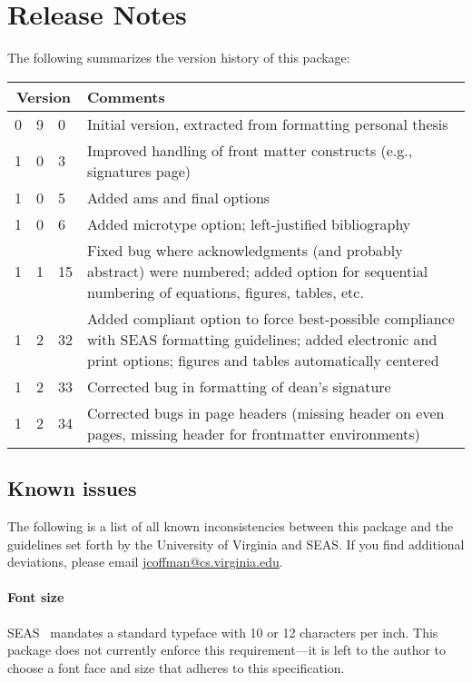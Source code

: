 \documentclass[10pt]{article}
\newcommand{\option}[1]{#1}
\begin{document}


\section{Release Notes}\label{section:release notes}
The following summarizes the version history of this package:
\begin{longtable}{r@{.}r@{.}lp{.8\linewidth}}
  \multicolumn{3}{c}{Version} & Comments\\
  \midrule
  0	& 9	& 0	& Initial version, extracted from formatting personal thesis\\[2ex] %
  1	& 0	& 3	& Improved handling of front matter constructs (e.g., signatures page)\\
  1	& 0	& 5	& Added \option{ams} and \option{final} options\\
  1	& 0	& 6	& Added \option{microtype} option; left-justified bibliography\\
  1	& 1	& 15	& Fixed bug where acknowledgments (and probably abstract) were numbered; added option for sequential numbering of equations, figures, tables, etc.\\
  1	& 2	& 32 	& Added \option{compliant} option to force best-possible compliance with \gls{SEAS} formatting guidelines; added \option{electronic} and \option{print} options; figures and tables automatically centered\\
  1	& 2	& 33	& Corrected bug in formatting of dean's signature\\
  1	& 2	& 34	& Corrected bugs in page headers (missing header on even pages, missing header for frontmatter environments)\\
\end{longtable}

\subsection*{Known issues}
The following is a list of all known inconsistencies between this package and the guidelines set forth by the University of Virginia and \gls{SEAS}.
If you find additional deviations, please email \url{jcoffman@cs.virginia.edu}.

\paragraph{Font size}
\Gls{SEAS}~\cite{seas:instructions} mandates a standard typeface with 10 or 12 characters per inch.
This package does not currently enforce this requirement---it is left to the author to choose a font face and size that adheres to this specification.
\end{document}
